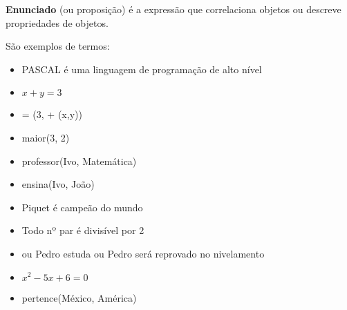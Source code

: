 \documentclass[
	12pt,				%
	twoside,			%
	a4paper,			%
	english,			%
	french,				%
	spanish,			%
	brazil,				%
	]{abntex2}
\begin{document}
\textbf{Enunciado} (ou proposição) é a expressão que correlaciona objetos ou descreve propriedades de objetos.

\noindent São exemplos de termos:

\begin{itemize}[itemsep=0.01pt]
\renewcommand\labelitemi{\textbf{-}}
    \item PASCAL é uma linguagem de programação de alto nível
    \item $x + y = 3$
    \item  = (3, + (x,y))
    \item  maior(3, 2)
    \item professor(Ivo, Matemática)
    \item ensina(Ivo, João)
    \item Piquet é campeão do mundo
    \item Todo nº par é divisível por 2
    \item ou Pedro estuda ou Pedro será reprovado no nivelamento
    \item $x^2 - 5x + 6 = 0$
    \item pertence(México, América)

\newpage



\end{itemize}
\end{document}
